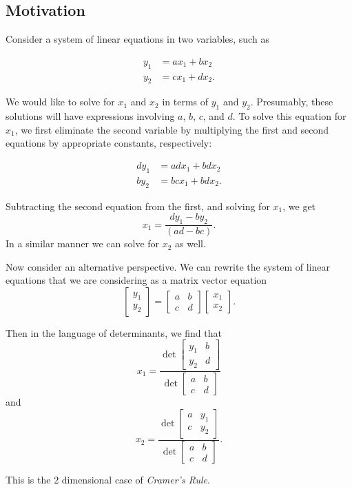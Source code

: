 \subsection{Motivation}

Consider a system of linear equations in two variables, such as

\begin{align*}
y_1 &= ax_1 + bx_2 \\
y_2 &= cx_1 + dx_2.
\end{align*}

We would like to solve for $x_1$ and $x_2$ in terms of $y_1$ and $y_2$. Presumably, these solutions will have expressions involving $a$, $b$, $c$, and $d$. To solve this equation for $x_1$, we first eliminate the second variable by multiplying the first and second equations by appropriate constants, respectively:

\begin{align*}
dy_1 &= adx_1 + bdx_2 \\
by_2 &= bcx_1 + bdx_2.
\end{align*}

Subtracting the second equation from the first, and solving for $x_1$, we get
\[x_1 = \frac{dy_1 - by_2}{(ad-bc)}.\]
In a similar manner we can solve for $x_2$ as well.

Now consider an alternative perspective. We can rewrite the system of linear equations that we are considering as a matrix vector equation
\[\begin{bmatrix}y_1 \\ y_2 \end{bmatrix} = \begin{bmatrix}a & b \\ c & d\end{bmatrix}\begin{bmatrix}x_1 \\ x_2\end{bmatrix}.\]

Then in the language of determinants, we find that 
\[x_1 = \frac{\det{ \begin{bmatrix}y_1 & b \\ y_2 & d\end{bmatrix}}}{\det \begin{bmatrix}a & b \\ c & d\end{bmatrix}}\] and
\[x_2 = \frac{\det{ \begin{bmatrix}a & y_1 \\ c& y_2\end{bmatrix}}}{\det \begin{bmatrix}a & b \\ c & d\end{bmatrix}}.\]

This is the $2$ dimensional case of \textit{Cramer's Rule}.